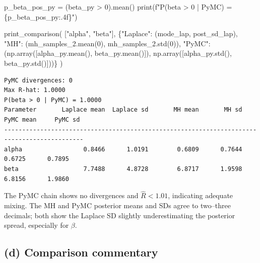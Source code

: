 \documentclass[
  letterpaper,
  DIV=11,
  numbers=noendperiod]{scrartcl}
\newenvironment{Shaded}{\begin{snugshade}}{\end{snugshade}}
\newcommand{\BuiltInTok}[1]{\textcolor[rgb]{0.00,0.23,0.31}{#1}}
\newcommand{\DecValTok}[1]{\textcolor[rgb]{0.68,0.00,0.00}{#1}}
\newcommand{\NormalTok}[1]{\textcolor[rgb]{0.00,0.23,0.31}{#1}}
\newcommand{\OperatorTok}[1]{\textcolor[rgb]{0.37,0.37,0.37}{#1}}
\newcommand{\SpecialCharTok}[1]{\textcolor[rgb]{0.37,0.37,0.37}{#1}}
\newcommand{\SpecialStringTok}[1]{\textcolor[rgb]{0.13,0.47,0.30}{#1}}
\newcommand{\StringTok}[1]{\textcolor[rgb]{0.13,0.47,0.30}{#1}}
\begin{document}
\begin{Shaded}
\begin{Highlighting}[]
\NormalTok{p\_beta\_pos\_py }\OperatorTok{=}\NormalTok{ (beta\_py }\OperatorTok{\textgreater{}} \DecValTok{0}\NormalTok{).mean()}
\BuiltInTok{print}\NormalTok{(}\SpecialStringTok{f"P(beta \textgreater{} 0 | PyMC) = }\SpecialCharTok{\{}\NormalTok{p\_beta\_pos\_py}\SpecialCharTok{:.4f\}}\SpecialStringTok{"}\NormalTok{)}

\NormalTok{print\_comparison(}
\NormalTok{    [}\StringTok{"alpha"}\NormalTok{, }\StringTok{"beta"}\NormalTok{],}
\NormalTok{    \{}\StringTok{"Laplace"}\NormalTok{: (mode\_lap, post\_sd\_lap),}
     \StringTok{"MH"}\NormalTok{:      (mh\_samples\_2.mean(}\DecValTok{0}\NormalTok{), mh\_samples\_2.std(}\DecValTok{0}\NormalTok{)),}
     \StringTok{"PyMC"}\NormalTok{:    (np.array([alpha\_py.mean(), beta\_py.mean()]),}
\NormalTok{                 np.array([alpha\_py.std(),  beta\_py.std()]))\}}
\NormalTok{)}
\end{Highlighting}
\end{Shaded}

\begin{verbatim}
PyMC divergences: 0
Max R-hat: 1.0000
P(beta > 0 | PyMC) = 1.0000
Parameter       Laplace mean  Laplace sd       MH mean       MH sd     PyMC mean     PyMC sd
--------------------------------------------------------------------------------------------
alpha                 0.8466      1.0191        0.6809      0.7644        0.6725      0.7895
beta                  7.7488      4.8728        6.8717      1.9598        6.8156      1.9860
\end{verbatim}

The PyMC chain shows no divergences and \(\hat R < 1.01\), indicating
adequate mixing. The MH and PyMC posterior means and SDs agree to
two--three decimals; both show the Laplace SD slightly underestimating
the posterior spread, especially for \(\beta\).

\subsection{(d) Comparison commentary}\label{d-comparison-commentary}
\end{document}
